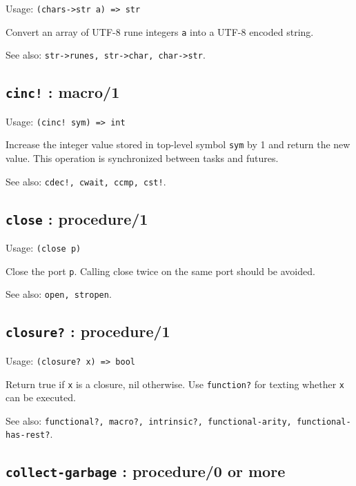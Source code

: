 \documentclass[
]{article}
\newcommand{\passthrough}[1]{#1}
\begin{document}
Usage: \passthrough{\lstinline!(chars->str a) => str!}

Convert an array of UTF-8 rune integers \passthrough{\lstinline!a!} into
a UTF-8 encoded string.

See also: \passthrough{\lstinline!str->runes, str->char, char->str!}.

\hypertarget{cinc-macro1-1}{%
\subsection{\texorpdfstring{\texttt{cinc!} :
macro/1}{cinc! : macro/1}}\label{cinc-macro1-1}}

Usage: \passthrough{\lstinline"(cinc! sym) => int"}

Increase the integer value stored in top-level symbol
\passthrough{\lstinline!sym!} by 1 and return the new value. This
operation is synchronized between tasks and futures.

See also: \passthrough{\lstinline"cdec!, cwait, ccmp, cst!"}.

\hypertarget{close-procedure1-1}{%
\subsection{\texorpdfstring{\texttt{close} :
procedure/1}{close : procedure/1}}\label{close-procedure1-1}}

Usage: \passthrough{\lstinline!(close p)!}

Close the port \passthrough{\lstinline!p!}. Calling close twice on the
same port should be avoided.

See also: \passthrough{\lstinline!open, stropen!}.

\hypertarget{closure-procedure1-1}{%
\subsection{\texorpdfstring{\texttt{closure?} :
procedure/1}{closure? : procedure/1}}\label{closure-procedure1-1}}

Usage: \passthrough{\lstinline!(closure? x) => bool!}

Return true if \passthrough{\lstinline!x!} is a closure, nil otherwise.
Use \passthrough{\lstinline!function?!} for texting whether
\passthrough{\lstinline!x!} can be executed.

See also:
\passthrough{\lstinline!functional?, macro?, intrinsic?, functional-arity, functional-has-rest?!}.

\hypertarget{collect-garbage-procedure0-or-more-1}{%
\subsection{\texorpdfstring{\texttt{collect-garbage} : procedure/0 or
more}{collect-garbage : procedure/0 or more}}\label{collect-garbage-procedure0-or-more-1}}
\end{document}
